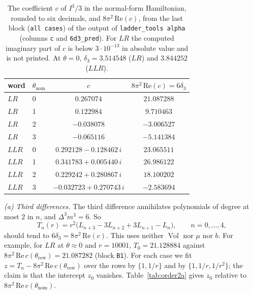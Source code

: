 \documentclass[11pt]{amsart}
\theoremstyle{definition}
\theoremstyle{remark}
\newcommand{\Vol}{\operatorname{Vol}}
\begin{document}
\begin{table}[ht]
\centering
\begin{tabular}{llcc}
\toprule
word & $\theta_{\mathrm{nom}}$ & $c$ & $8\pi^2\,\mathrm{Re}(c) = 6\delta_3$ \\
\midrule
$LR$  & 0 & $0.267074$  & $21.087288$ \\
$LR$  & 1 & $0.122984$  & $9.710463$ \\
$LR$  & 2 & $-0.038078$ & $-3.006527$ \\
$LR$  & 3 & $-0.065116$ & $-5.141384$ \\
$LLR$ & 0 & $0.292128 - 0.128462\,i$  & $23.065511$ \\
$LLR$ & 1 & $0.341783 + 0.005440\,i$  & $26.986122$ \\
$LLR$ & 2 & $0.229242 + 0.280867\,i$  & $18.100202$ \\
$LLR$ & 3 & $-0.032723 + 0.270743\,i$ & $-2.583694$ \\
\bottomrule
\end{tabular}
\caption{The coefficient $c$ of $I^3/3$ in the normal-form Hamiltonian, rounded to six
decimals, and $8\pi^2\,\mathrm{Re}(c)$, from the last block (\texttt{all cases}) of the
output of \texttt{ladder\_tools alpha} (columns \texttt{c} and \texttt{6d3\_pred}). For
$LR$ the computed imaginary part of $c$ is below $3\cdot10^{-13}$ in absolute value and
is not printed. At $\theta = 0$, $\delta_3 = 3.514548$ ($LR$) and $3.844252$ ($LLR$).}
\label{tab:c}
\end{table}

\emph{(a) Third differences.} The third difference annihilates polynomials of degree
at most $2$ in $n$, and $\Delta^3 m^3 = 6$. So
\[
T_n(r) = r^2\big(L_{n+3} - 3L_{n+2} + 3L_{n+1} - L_n\big), \qquad n = 0, \dots, 4,
\]
should tend to $6\delta_3 = 8\pi^2\,\mathrm{Re}(c)$. This uses neither $\Vol$ nor
$\mu$ nor $b$. For example, for $LR$ at $\theta \approx 0$ and $r = 10001$,
$T_0 = 21.128884$ against $8\pi^2\,\mathrm{Re}\,c(\theta_{\mathrm{row}}) = 21.087282$
(block \texttt{B1}). For each case we fit $z = T_n - 8\pi^2\,\mathrm{Re}\,
c(\theta_{\mathrm{row}})$ over the rows by $\{1, 1/r\}$ and by $\{1, 1/r, 1/r^2\}$; the
claim is that the intercept $z_0$ vanishes. Table~\ref{tab:order2a} gives $z_0$
relative to $8\pi^2\,\mathrm{Re}\,c(\theta_{\mathrm{nom}})$.
\end{document}
